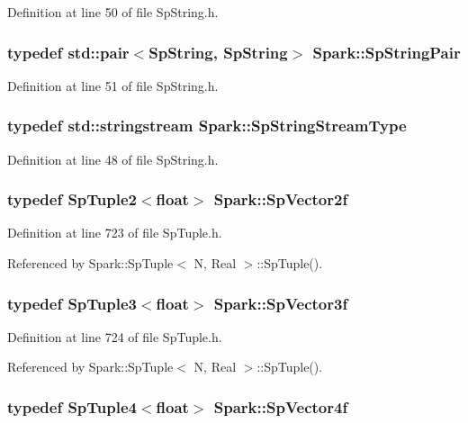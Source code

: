 Definition at line 50 of file Sp\-String.h.
\subsubsection{\setlength{\rightskip}{0pt plus 5cm}typedef std::pair$<${\bf Sp\-String}, {\bf Sp\-String}$>$ {\bf Spark::Sp\-String\-Pair}}\label{namespaceSpark_a6}


Definition at line 51 of file Sp\-String.h.
\subsubsection{\setlength{\rightskip}{0pt plus 5cm}typedef std::stringstream {\bf Spark::Sp\-String\-Stream\-Type}}\label{namespaceSpark_a3}


Definition at line 48 of file Sp\-String.h.
\subsubsection{\setlength{\rightskip}{0pt plus 5cm}typedef {\bf Sp\-Tuple2}$<$float$>$ {\bf Spark::Sp\-Vector2f}}\label{namespaceSpark_a19}


Definition at line 723 of file Sp\-Tuple.h.

Referenced by Spark::Sp\-Tuple$<$ N, Real $>$::Sp\-Tuple().
\subsubsection{\setlength{\rightskip}{0pt plus 5cm}typedef {\bf Sp\-Tuple3}$<$float$>$ {\bf Spark::Sp\-Vector3f}}\label{namespaceSpark_a20}


Definition at line 724 of file Sp\-Tuple.h.

Referenced by Spark::Sp\-Tuple$<$ N, Real $>$::Sp\-Tuple().
\subsubsection{\setlength{\rightskip}{0pt plus 5cm}typedef {\bf Sp\-Tuple4}$<$float$>$ {\bf Spark::Sp\-Vector4f}}\label{namespaceSpark_a21}


